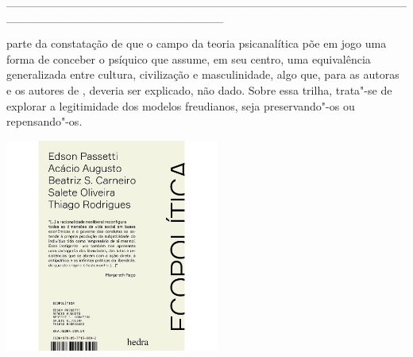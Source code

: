 \hspace*{-2cm}\_\_\_\_\_\_\_\_\_\_\_\_\_\_\_\_\_\_\_\_\_\_\_\_\_\_\_\_\_\_\_\_\_\_\_\_\_\_\_\_\_\_\_\_\_\_\_\_\_\_\_\_\_\_\_\_\_\_\_\_\_\_\_\_\_\_\_\_\_\_\_\_\_\_

\medskip

 parte da constatação de que o campo da teoria psicanalítica põe em jogo uma forma de conceber o psíquico que assume, em seu centro, uma equivalência generalizada entre cultura, civilização e masculinidade, algo que, para as autoras e os autores de {}, deveria ser explicado, não dado. Sobre essa trilha, trata"-se de explorar a legitimidade dos modelos freudianos, seja preservando"-os ou repensando"-os.

\hspace{.5cm}

\hspace*{-.4cm}\begin{minipage}[c]{0.90\linewidth}
\small{
{}}
\end{minipage}

\pagebreak

\hspace{.5cm}

\begin{center}
\hspace*{-.5cm}\includegraphics[width=70mm]{./eco.jpeg}
\end{center}

